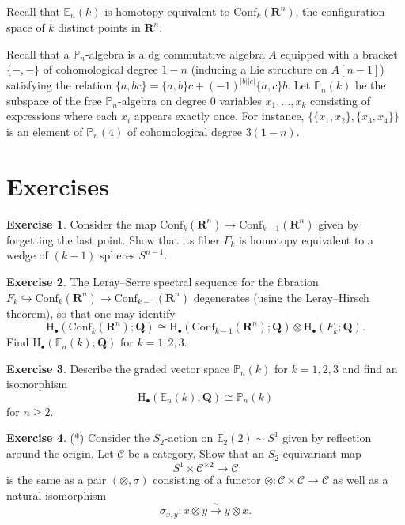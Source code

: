 \documentclass[10pt]{amsart}
\newcommand{\bE}{\mathbb{E}}
\newcommand{\rH}{\mathrm{H}}
\newcommand{\bP}{\mathbb{P}}
\newcommand{\R}{\mathbf{R}}
\newcommand{\Conf}{\mathrm{Conf}}
\theoremstyle{definition}
\newtheorem{exercise}{Exercise}
\newcommand{\cC}{\mathcal{C}}
\newcommand{\Q}{\mathbf{Q}}
\theoremstyle{definition}
\begin{document}
Recall that $\bE_n(k)$ is homotopy equivalent to $\Conf_k(\R^n)$, the configuration space of $k$ distinct points in $\R^n$.

Recall that a $\bP_n$-algebra is a dg commutative algebra $A$ equipped with a bracket $\{-, -\}$ of cohomological degree $1-n$ (inducing a Lie structure on $A[n-1]$) satisfying the relation $\{a, bc\} = \{a, b\}c + (-1)^{|b||c|}\{a, c\}b$. Let $\bP_n(k)$ be the subspace of the free $\bP_n$-algebra on degree $0$ variables $x_1, \dots, x_k$ consisting of expressions where each $x_i$ appears exactly once. For instance, $\{\{x_1, x_2\}, \{x_3, x_4\}\}$ is an element of $\bP_n(4)$ of cohomological degree $3(1-n)$.

\section{Exercises}
\begin{exercise}
Consider the map $\Conf_k(\R^n)\rightarrow \Conf_{k-1}(\R^n)$ given by forgetting the last point. Show that its fiber $F_k$ is homotopy equivalent to a wedge of $(k-1)$ spheres $S^{n-1}$.
\end{exercise}

\begin{exercise}
The Leray--Serre spectral sequence for the fibration $F_k\hookrightarrow \Conf_k(\R^n)\rightarrow \Conf_{k-1}(\R^n)$ degenerates (using the Leray--Hirsch theorem), so that one may identify
\[\rH_\bullet(\Conf_k(\R^n);\Q)\cong \rH_\bullet(\Conf_{k-1}(\R^n);\Q)\otimes \rH_\bullet(F_k;\Q).\]
Find $\rH_\bullet(\bE_n(k);\Q)$ for $k=1,2,3$.
\end{exercise}

\begin{exercise}
Describe the graded vector space $\bP_n(k)$ for $k=1,2,3$ and find an isomorphism
\[\rH_\bullet(\bE_n(k);\Q)\cong \bP_n(k)\]
for $n\geq 2$.
\end{exercise}

\begin{exercise}
(*) Consider the $S_2$-action on $\bE_2(2)\sim S^1$ given by reflection around the origin. Let $\cC$ be a category. Show that an $S_2$-equivariant map
\[S^1\times \cC^{\times 2}\longrightarrow \cC\]
is the same as a pair $(\otimes, \sigma)$ consisting of a functor $\otimes\colon \cC\times \cC\rightarrow \cC$ as well as a natural isomorphism
\[\sigma_{x, y}\colon x\otimes y\xrightarrow{\sim} y\otimes x.\]
\end{exercise}
\end{document}
